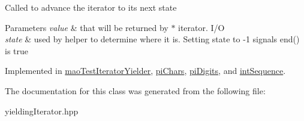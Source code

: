 Called to advance the iterator to its next state 
\begin{DoxyParams}{Parameters}
{\em value} & that will be returned by $\ast$ iterator. I/O \\
\hline
{\em state} & used by helper to determine where it is. Setting state to -\/1 signals end() is true \\
\hline
\end{DoxyParams}


Implemented in \hyperlink{classmaoTestIteratorYielder_a88aff5d153ff1dfdd54710706da7eeec}{mao\+Test\+Iterator\+Yielder}, \hyperlink{classpiChars_adc00b73e9ec09756b81d6da657ad5170}{pi\+Chars}, \hyperlink{classpiDigits_a3957780a86699d5b112cb2de9d465e84}{pi\+Digits}, and \hyperlink{classintSequence_ab624bfe357dcb3b34cb7091e4a254d4e}{int\+Sequence}.



The documentation for this class was generated from the following file\+:\begin{DoxyCompactItemize}
\item 
yielding\+Iterator.\+hpp\end{DoxyCompactItemize}
